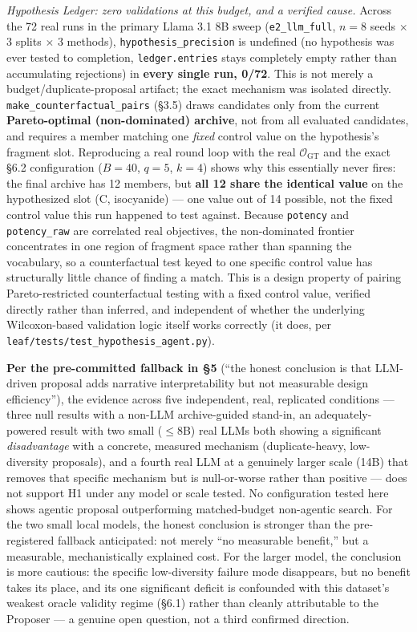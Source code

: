 \documentclass{article}
\begin{document}
\emph{Hypothesis Ledger: zero validations at this budget, and a verified
cause.} Across the 72 real runs in the primary Llama 3.1 8B sweep
(\texttt{e2\_llm\_full}, $n=8$ seeds $\times$ 3 splits $\times$ 3
methods), \texttt{hypothesis\_precision} is undefined (no hypothesis was
ever tested to completion, \texttt{ledger.entries} stays completely
empty rather than accumulating rejections) in \textbf{every single run,
0/72}. This is not merely a budget/duplicate-proposal artifact; the exact
mechanism was isolated directly. \texttt{make\_counterfactual\_pairs}
(\S3.5) draws candidates only from the current \textbf{Pareto-optimal
(non-dominated) archive}, not from all evaluated candidates, and requires
a member matching one \emph{fixed} control value on the hypothesis's
fragment slot. Reproducing a real round loop with the real $\mathcal{O}_{\text{GT}}$
and the exact \S6.2 configuration ($B=40$, $q=5$, $k=4$) shows why this
essentially never fires: the final archive has 12 members, but
\textbf{all 12 share the identical value} on the hypothesized slot (C,
isocyanide) --- one value out of 14 possible, not the fixed control
value this run happened to test against. Because \texttt{potency} and
\texttt{potency\_raw} are correlated real objectives, the non-dominated
frontier concentrates in one region of fragment space rather than
spanning the vocabulary, so a counterfactual test keyed to one specific
control value has structurally little chance of finding a match. This is
a design property of pairing Pareto-restricted counterfactual testing
with a fixed control value, verified directly rather than inferred, and
independent of whether the underlying Wilcoxon-based validation logic
itself works correctly (it does, per \texttt{leaf/tests/test\_hypothesis\_agent.py}).

\textbf{Per the pre-committed fallback in \S5} (``the honest conclusion is
that LLM-driven proposal adds narrative interpretability but not
measurable design efficiency''), the evidence across five independent,
real, replicated conditions --- three null results with a non-LLM
archive-guided stand-in, an adequately-powered result with two small
($\le$8B) real LLMs both showing a significant \emph{disadvantage} with a
concrete, measured mechanism (duplicate-heavy, low-diversity proposals),
and a fourth real LLM at a genuinely larger scale (14B) that removes that
specific mechanism but is null-or-worse rather than positive --- does not
support H1 under any model or scale tested. No configuration tested here
shows agentic proposal outperforming matched-budget non-agentic search.
For the two small local models, the honest conclusion is stronger than
the pre-registered fallback anticipated: not merely ``no measurable
benefit,'' but a measurable, mechanistically explained cost. For the
larger model, the conclusion is more cautious: the specific low-diversity
failure mode disappears, but no benefit takes its place, and its one
significant deficit is confounded with this dataset's weakest oracle
validity regime (\S6.1) rather than cleanly attributable to the Proposer
--- a genuine open question, not a third confirmed direction.
\end{document}
